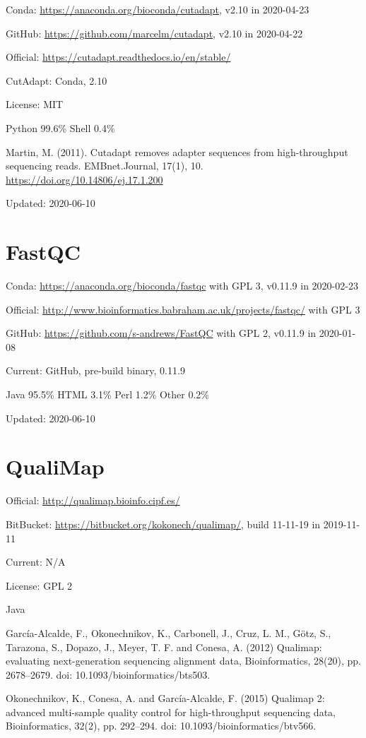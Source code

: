 \documentclass[]{article}
\begin{document}
Conda: \url{https://anaconda.org/bioconda/cutadapt}, v2.10 in 2020-04-23

GitHub: \url{https://github.com/marcelm/cutadapt}, v2.10 in 2020-04-22

Official: \url{https://cutadapt.readthedocs.io/en/stable/}

CutAdapt: Conda, 2.10

License: MIT

Python 99.6\% Shell 0.4\%

Martin, M. (2011). Cutadapt removes adapter sequences from high-throughput sequencing reads. EMBnet.Journal, 17(1), 10. \url{https://doi.org/10.14806/ej.17.1.200}

Updated: 2020-06-10

\section{FastQC}

Conda: \url{https://anaconda.org/bioconda/fastqc} with GPL 3, v0.11.9 in 2020-02-23

Official: \url{http://www.bioinformatics.babraham.ac.uk/projects/fastqc/} with GPL 3

GitHub: \url{https://github.com/s-andrews/FastQC} with GPL 2, v0.11.9 in 2020-01-08

Current: GitHub, pre-build binary, 0.11.9

Java 95.5\% HTML 3.1\% Perl 1.2\% Other 0.2\%

Updated: 2020-06-10

\section{QualiMap}

Official: \url{http://qualimap.bioinfo.cipf.es/}

BitBucket: \url{https://bitbucket.org/kokonech/qualimap/}, build 11-11-19 in 2019-11-11

Current: N/A

License: GPL 2

Java

García-Alcalde, F., Okonechnikov, K., Carbonell, J., Cruz, L. M., Götz, S., Tarazona, S., Dopazo, J., Meyer, T. F. and Conesa, A. (2012) Qualimap: evaluating next-generation sequencing alignment data, Bioinformatics, 28(20), pp. 2678–2679. doi: 10.1093/bioinformatics/bts503.

Okonechnikov, K., Conesa, A. and García-Alcalde, F. (2015) Qualimap 2: advanced multi-sample quality control for high-throughput sequencing data, Bioinformatics, 32(2), pp. 292–294. doi: 10.1093/bioinformatics/btv566.
\end{document}
